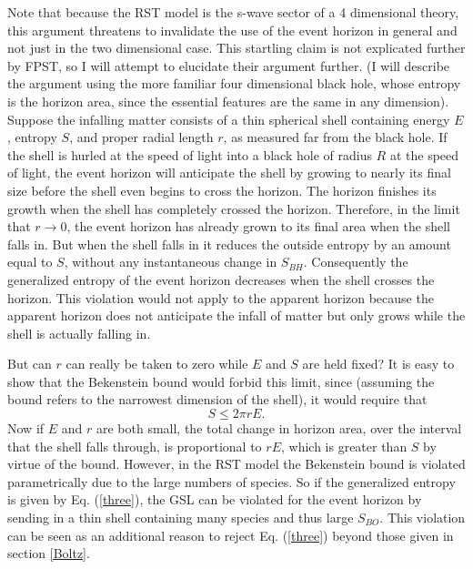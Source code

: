 \documentclass{article}
\begin{document}
Note that because the RST model is the s-wave sector of a 4 dimensional theory, this argument threatens to invalidate the use of the event horizon in general and not just in the two dimensional case.  This startling claim is not explicated further by FPST, so I will attempt to elucidate their argument further.  (I will describe the argument using the more familiar four dimensional black hole, whose entropy is the horizon area, since the essential features are the same in any dimension).  Suppose the infalling matter consists of a thin spherical shell containing energy $E$, entropy $S$, and proper radial length $r$, as measured far from the black hole.  If the shell is hurled at the speed of light into a black hole of radius $R$ at the speed of light, the event horizon will anticipate the shell by growing to nearly its final size before the shell even begins to cross the horizon.  The horizon finishes its growth when the shell has completely crossed the horizon.  Therefore, in the limit that $r \to 0$, the event horizon has already grown to its final area when the shell falls in.  But when the shell falls in it reduces the outside entropy by an amount equal to $S$, without any instantaneous change in $S_{BH}$.  Consequently the generalized entropy of the event horizon decreases when the shell crosses the horizon.  This violation would not apply to the apparent horizon because the apparent horizon does not anticipate the infall of matter but only grows while the shell is actually falling in.

But can $r$ can really be taken to zero while $E$ and $S$ are held fixed?  It is easy to show that the Bekenstein bound would forbid this limit, since (assuming the bound refers to the narrowest dimension of the shell), it would require that
\begin{equation}
S \le 2\pi rE.
\end{equation}
Now if $E$ and $r$ are both small, the total change in horizon area, over the interval that the shell falls through, is proportional to $rE$, which is greater than $S$ by virtue of the bound.  However, in the RST model the Bekenstein bound is violated parametrically due to the large numbers of species.  So if the generalized entropy is given by Eq. (\ref{three}), the GSL can be violated for the event horizon by sending in a thin shell containing many species and thus large $S_{BO}$.  This violation can be seen as an additional reason to reject Eq. (\ref{three}) beyond those given in section \ref{Boltz}.
\end{document}
